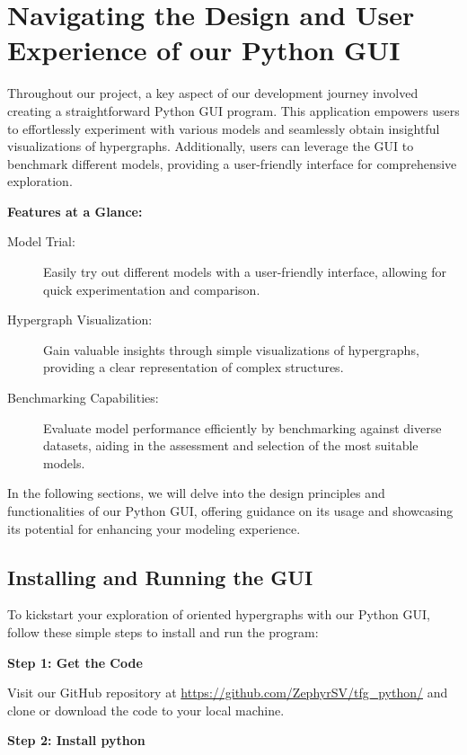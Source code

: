 \section{Navigating the Design and User Experience of our Python GUI}

Throughout our project, a key aspect of our development journey involved creating a straightforward Python GUI program. This application empowers users to effortlessly experiment with various models and seamlessly obtain insightful visualizations of hypergraphs. Additionally, users can leverage the GUI to benchmark different models, providing a user-friendly interface for comprehensive exploration.

\noindent\hrulefill

\textbf{Features at a Glance:}

\begin{description}
    \item[Model Trial:] Easily try out different models with a user-friendly interface, allowing for quick experimentation and comparison.
    \item[Hypergraph Visualization:] Gain valuable insights through simple visualizations of hypergraphs, providing a clear representation of complex structures.
    \item[Benchmarking Capabilities:] Evaluate model performance efficiently by benchmarking against diverse datasets, aiding in the assessment and selection of the most suitable models.
\end{description}

\noindent\hrulefill    

In the following sections, we will delve into the design principles and functionalities of our Python GUI, offering guidance on its usage and showcasing its potential for enhancing your modeling experience.

\subsection{  Installing and Running the GUI}

To kickstart your exploration of oriented hypergraphs with our Python GUI, follow these simple steps to install and run the program:

\textbf{Step 1: Get the Code}

Visit our GitHub repository at \url{https://github.com/ZephyrSV/tfg_python/} and clone or download the code to your local machine.

\textbf{Step 2: Install python}

